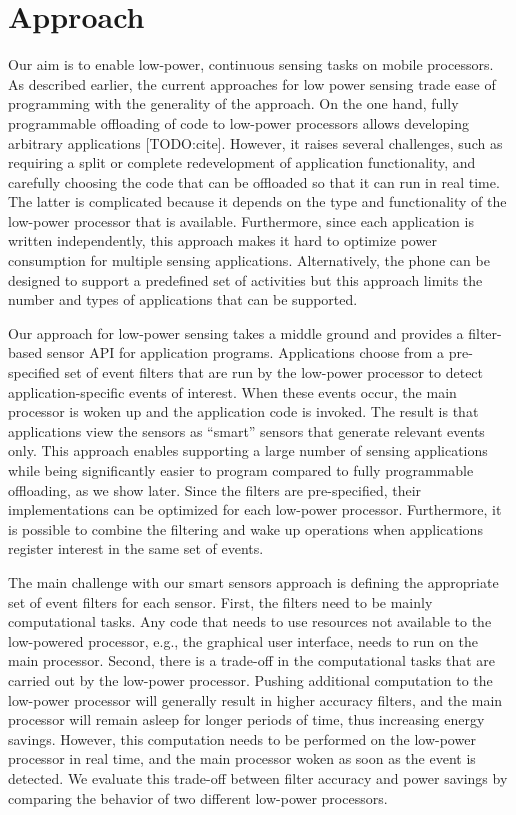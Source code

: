 \section{Approach}
\label{sec:approach}

Our aim is to enable low-power, continuous sensing tasks on mobile processors.
As described earlier, the current approaches for low power sensing trade ease of
programming with the generality of the approach. On the one hand, fully
programmable offloading of code to low-power processors allows developing
arbitrary applications [TODO:cite]. However, it raises several challenges, such as
requiring a split or complete redevelopment of application functionality, and
carefully choosing the code that can be offloaded so that it can run in real
time. The latter is complicated because it depends on the type and functionality
of the low-power processor that is available. Furthermore, since each
application is written independently, this approach makes it hard to optimize
power consumption for multiple sensing applications. Alternatively, the phone
can be designed to support a predefined set of activities but this approach
limits the number and types of applications that can be supported.

Our approach for low-power sensing takes a middle ground and provides a
filter-based sensor API for application programs. Applications choose from a
pre-specified set of event filters that are run by the low-power processor to
detect application-specific events of interest. When these events occur, the
main processor is woken up and the application code is invoked. The result is
that applications view the sensors as ``smart'' sensors that generate relevant
events only. This approach enables supporting a large number of sensing
applications while being significantly easier to program compared to fully
programmable offloading, as we show later. Since the filters are pre-specified,
their implementations can be optimized for each low-power
processor. Furthermore, it is possible to combine the filtering and wake up
operations when applications register interest in the same set of events.

The main challenge with our smart sensors approach is defining the appropriate
set of event filters for each sensor. First, the filters need to be mainly
computational tasks. Any code that needs to use resources not available to the
low-powered processor, e.g., the graphical user interface, needs to run on the
main processor. Second, there is a trade-off in the computational tasks that are
carried out by the low-power processor. Pushing additional computation to the
low-power processor will generally result in higher accuracy filters, and the
main processor will remain asleep for longer periods of time, thus increasing
energy savings. However, this computation needs to be performed on the low-power
processor in real time, and the main processor woken as soon as the event is
detected. We evaluate this trade-off between filter accuracy and power savings
by comparing the behavior of two different low-power processors.

